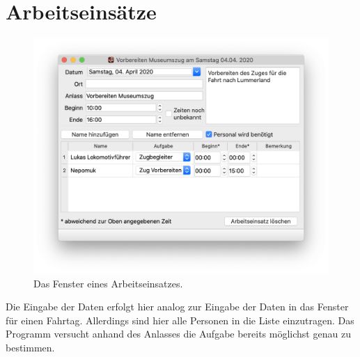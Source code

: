 \chapter{Arbeitseinsätze}\label{einsatz:arbeitseinsatz}
\begin{figure}[h!]
	\includegraphics[width=\textwidth]{img/arbeitseinsatz}
	\caption{Das Fenster eines Arbeitseinsatzes.}
	\label{fig:einsatz:arbeitseinsatz}
\end{figure}
Die Eingabe der Daten erfolgt hier analog zur Eingabe der Daten in das Fenster für einen Fahrtag.
Allerdings sind hier alle Personen in die Liste einzutragen.
Das Programm versucht anhand des Anlasses die Aufgabe bereits möglichst genau zu bestimmen.
